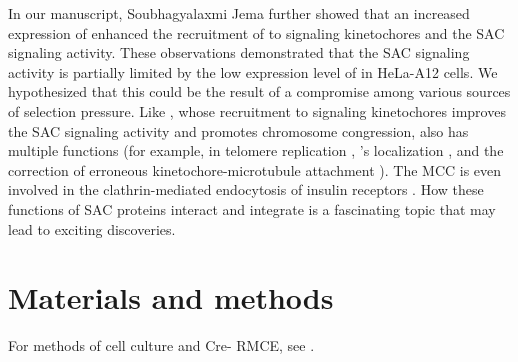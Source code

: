 In our manuscript, Soubhagyalaxmi Jema further showed that an increased expression of  enhanced the recruitment of  to signaling kinetochores and the SAC signaling activity. These observations demonstrated that the SAC signaling activity is partially limited by the low expression level of  in HeLa-A12 cells. We hypothesized that this could be the result of a compromise among various sources of selection pressure. Like , whose recruitment to signaling kinetochores improves the SAC signaling activity and promotes chromosome congression,  also has multiple functions (for example, in telomere replication \cite{BUB3-BUB1_TelomereReplication}, 's localization \cite{CENPU+BUB1-PLK1}, and the correction of erroneous kinetochore-microtubule attachment \cite{BUB1_pH2A_AuroraB}). The MCC is even involved in the clathrin-mediated endocytosis of insulin receptors \cite{MCC_IREndocytosis, Choi2019}. How these functions of SAC proteins interact and integrate is a fascinating topic that may lead to exciting discoveries. %

\section{Materials and methods}
For methods of cell culture and Cre- RMCE, see .

